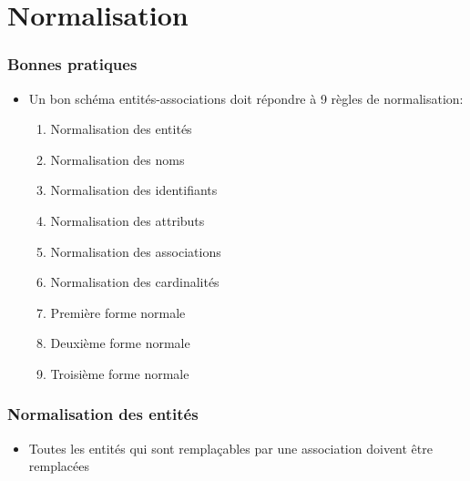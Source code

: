 \section[Normalisation]{Normalisation}


\begin{frame}
  \frametitle{Bonnes pratiques}
  \begin{itemize}
    \item Un bon schéma entités-associations doit répondre à 9 règles de normalisation:
      \begin{enumerate}
        \item Normalisation des entités
        \item Normalisation des noms
        \item Normalisation des identifiants
        \item Normalisation des attributs
        \item Normalisation des associations
        \item Normalisation des cardinalités
        \item Première forme normale
        \item Deuxième forme normale
        \item Troisième forme normale
      \end{enumerate}
  \end{itemize}
\end{frame}

\begin{frame}
  \frametitle{Normalisation des entités}
  \begin{itemize}
    \item Toutes les entités qui sont remplaçables par une association doivent être remplacées
  \end{itemize}
\end{frame}


